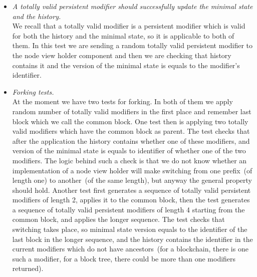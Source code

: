 \begin{enumerate}[\IEEEsetlabelwidth{Z}]
\begin{itemize}[]

\item \textit{A totally valid persistent modifier should successfully update the minimal state and the history.}\\
We recall that a totally valid modifier is a persistent modifier which is valid for both the history and the minimal state, so it is applicable to both of them. In this test we are sending a random totally valid persistent modifier to the node view holder component and then we are checking that history contains it and the version of the minimal state is equals to the modifier's identifier.\\

\item \textit{Forking tests.}\\

At the moment we have two tests for forking. In both of them we apply random number of totally valid modifiers in the first place and remember last block which we call the common block. One test then is applying two totally valid modifiers which have the common block as parent. The test checks that after the application the history contains whether one of these modifiers, and version of the minimal state is equals to identifier of whether one of the two modifiers. The logic behind such a check is that we do not know whether an implementation of a node view holder will make switching from one prefix~(of length one) to another~(of the same length), but anyway the general property should hold. Another test first generates a sequence of totally valid persistent modifiers of length 2, applies it to the common block, then the test generates a sequence of totally valid persistent modifiers of length 4 starting from the common block, and applies the longer sequence. The test checks that switching takes place, so minimal state version equals to the identifier of the last block in the longer sequence, and the history contains the identifier in the current modifiers which do not have ancestors~(for a blockchain, there is one such a modifier, for a block tree, there could be more than one modifiers returned). 


\end{itemize}
\end{enumerate}



